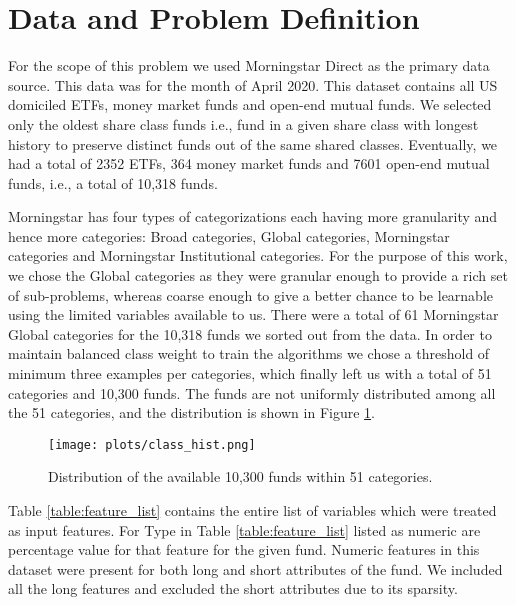 \documentclass[sigconf]{acmart}
\begin{document}
\section{Data and Problem Definition}
For the scope of this problem we used Morningstar Direct as the primary data source. This data was for the month of April 2020. This dataset contains all US domiciled ETFs, money market funds and open-end mutual funds. We selected only the oldest share class funds i.e., fund in a given share class with longest history to preserve distinct funds out of the same shared classes. Eventually, we had a total of 2352 ETFs, 364 money market funds and 7601 open-end mutual funds, i.e., a total of 10,318 funds. 

Morningstar has four types of categorizations each having more granularity and hence more categories: Broad categories, Global categories, Morningstar categories and Morningstar Institutional categories. For the purpose of this work, we chose the Global categories as they were granular enough to provide a rich set of sub-problems, whereas coarse enough to give a better chance to be learnable using the limited variables available to us. There were a total of 61 Morningstar Global categories \cite{morningstarglobalcategory} for the 10,318 funds we sorted out from the data. In order to maintain balanced class weight to train the algorithms we chose a threshold of minimum three examples per categories, which finally left us with a total of 51 categories and 10,300 funds. The funds are not uniformly distributed among all the 51 categories, and the distribution is shown in Figure \ref{fig:category_bar_graph}.

\begin{figure}[h]
    \centering
    \texttt{[image: plots/class\_hist.png]}
    \caption{Distribution of the available 10,300 funds within 51 categories.}
    \label{fig:category_bar_graph}
\end{figure}



Table \ref{table:feature_list} contains the entire list of variables which were treated as input features. For Type in Table \ref{table:feature_list} listed as numeric are percentage value for that feature for the given fund. Numeric features in this dataset were present for both long and short attributes of the fund. We included all the long features and excluded the short attributes due to its sparsity.
\end{document}
